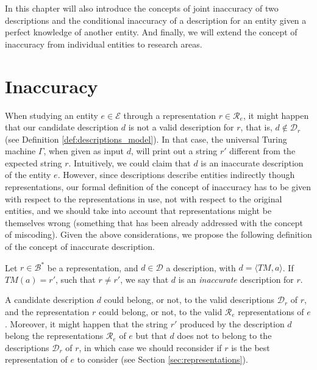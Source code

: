 {\color{red} In this chapter will also introduce the concepts of joint inaccuracy of two descriptions and the conditional inaccuracy of a description for an entity given a perfect knowledge of another entity.} And finally, we will extend the concept of inaccuracy from individual entities to research areas.

%
%
\section{Inaccuracy}
\label{sec:inaccuracy:inaccuracy}

When studying an entity $e \in \mathcal{E}$ through a representation $r \in \mathcal{R}_e$, it might happen that our candidate description $d$ is not a valid description for $r$, that is, $d \notin \mathcal{D}_r$ (see Definition \ref{def:descriptions_model}). In that case, the universal Turing machine $\Gamma$, when given as input $d$, will print out a string $r'$ different from the expected string $r$. Intuitively, we could claim that $d$ is an inaccurate description of the entity $e$. However, since descriptions describe entities indirectly though representations, our formal definition of the concept of inaccuracy has to be given with respect to the representations in use, not with respect to the original entities, and we should take into account that representations might be themselves wrong (something that has been already addressed with the concept of miscoding). Given the above considerations, we propose the following definition of the concept of inaccurate description.

\begin{definition}
Let $r \in \mathcal{B}^\ast$ be a representation, and $d \in \mathcal{D}$ a description, with $ d = \langle TM, a \rangle$. If $TM(a) = r'$, such that $r \neq r'$, we say that $d$ is an \emph{inaccurate} description for $r$.
\end{definition}

A candidate description $d$ could belong, or not, to the valid descriptions $\mathcal{D}_r$ of $r$,
and the representation $r$ could belong, or not, to the valid $\mathcal{R}_e$ representations of $e$. Moreover, it might happen that the string $r'$ produced by the description $d$ belong the representations $\mathcal{R}_e$ of $e$ but that $d$ does not to belong to the descriptions $\mathcal{D}_r$ of $r$, in which case we should reconsider if $r$ is the best representation of $e$ to consider (see Section \ref{sec:representations}).

